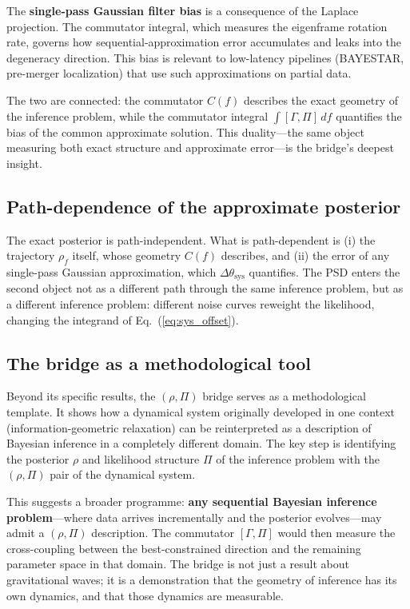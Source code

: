 \documentclass[twocolumn,prd,showpacs,superscriptaddress]{revtex4-2}
\newcommand{\eqnref}[1]{Eq.~(\ref{eq:#1})}
\begin{document}
The \textbf{single-pass Gaussian filter bias} is a consequence of the Laplace projection. The commutator integral, which measures the eigenframe rotation rate, governs how sequential-approximation error accumulates and leaks into the degeneracy direction. This bias is relevant to low-latency pipelines (BAYESTAR, pre-merger localization) that use such approximations on partial data.

The two are connected: the commutator $C(f)$ describes the exact geometry of the inference problem, while the commutator integral $\int [\Gamma,\Pi]\,df$ quantifies the bias of the common approximate solution. This duality---the same object measuring both exact structure and approximate error---is the bridge's deepest insight.

\subsection{Path-dependence of the approximate posterior}

The exact posterior is path-independent. What is path-dependent is (i) the trajectory $\rho_f$ itself, whose geometry $C(f)$ describes, and (ii) the error of any single-pass Gaussian approximation, which $\Delta\theta_{\text{sys}}$ quantifies. The PSD enters the second object not as a different path through the same inference problem, but as a different inference problem: different noise curves reweight the likelihood, changing the integrand of \eqnref{sys_offset}.

\subsection{The bridge as a methodological tool}

Beyond its specific results, the $(\rho, \Pi)$ bridge serves as a methodological template. It shows how a dynamical system originally developed in one context (information-geometric relaxation) can be reinterpreted as a description of Bayesian inference in a completely different domain. The key step is identifying the posterior $\rho$ and likelihood structure $\Pi$ of the inference problem with the $(\rho, \Pi)$ pair of the dynamical system.

This suggests a broader programme: \textbf{any sequential Bayesian inference problem}---where data arrives incrementally and the posterior evolves---may admit a $(\rho, \Pi)$ description. The commutator $[\Gamma, \Pi]$ would then measure the cross-coupling between the best-constrained direction and the remaining parameter space in that domain. The bridge is not just a result about gravitational waves; it is a demonstration that the geometry of inference has its own dynamics, and that those dynamics are measurable.
\end{document}
